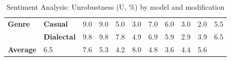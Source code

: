 \begin{table}[h]
{\begin{tabular}{llrrrrrrrrr}
\midrule
\textbf{Genre} & \textbf{Casual} & \cellcolor{blue!23} 9.0 & \cellcolor{blue!23} 9.0 & \cellcolor{blue!13} 5.0 & \cellcolor{blue!8} 3.0 & \cellcolor{blue!18} 7.0 & \cellcolor{blue!15} 6.0 & \cellcolor{blue!8} 3.0 & \cellcolor{blue!5} 2.0 & \cellcolor{blue!14} 5.5 \\
  & \textbf{Dialectal} & \cellcolor{blue!25} 9.8 & \cellcolor{blue!25} 9.8 & \cellcolor{blue!20} 7.8 & \cellcolor{blue!13} 4.9 & \cellcolor{blue!18} 6.9 & \cellcolor{blue!15} 5.9 & \cellcolor{blue!8} 2.9 & \cellcolor{blue!10} 3.9 & \cellcolor{blue!17} 6.5 \\
\midrule
\textbf{Average} &  \cellcolor{blue!17} 6.5 & \cellcolor{blue!20} 7.6 & \cellcolor{blue!14} 5.3 & \cellcolor{blue!11} 4.2 & \cellcolor{blue!21} 8.0 & \cellcolor{blue!12} 4.8 & \cellcolor{blue!9} 3.6 & \cellcolor{blue!11} 4.4 & \cellcolor{blue!14} 5.6 \\
\bottomrule
\end{tabular}}
\caption{Sentiment Analysis: Unrobustness (U, \%) by model and modification}\label{tab:sa_unrob}
\end{table}